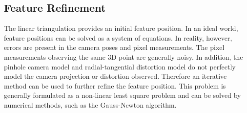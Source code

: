 \documentclass{report}
\begin{document}
\subsection{Feature Refinement}
\label{subsec:bundle_adjustment}

The linear triangulation provides an initial feature position. In an ideal
world, feature positions can be solved as a system of equations. In reality,
however, errors are present in the camera poses and pixel measurements. The
pixel measurements observing the same 3D point are generally noisy. In
addition, the pinhole camera model and radial-tangential distortion model do
not perfectly model the camera projection or distortion observed. Therefore an
iterative method can be used to further refine the feature position. This
problem is generally formulated as a non-linear least square problem and can be
solved by numerical methods, such as the Gauss-Newton algorithm.
\end{document}
